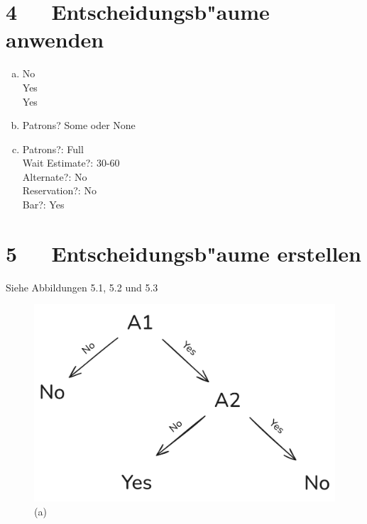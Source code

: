 \documentclass[10pt, oneside]{article}
\begin{document}
\section{4\ \ \ Entscheidungsb"aume anwenden}

\begin{enumerate}[(a)]
    \item No \\[5pt]
          Yes \\[5pt]
          Yes
    \item Patrons? Some oder None
    \item Patrons?: Full \\[5pt]
          Wait Estimate?: 30-60 \\[5pt]
          Alternate?: No \\[5pt]
          Reservation?: No \\[5pt]
          Bar?: Yes
\end{enumerate}

\section{5\ \ \ Entscheidungsb"aume erstellen}

Siehe Abbildungen 5.1, 5.2 und 5.3

\begin{figure}[p]
    \centering
    \includegraphics[width=1\textwidth]{./assets/ueb02-5-1.png}
    \caption{(a)}
\end{figure}

\FloatBarrier
\end{document}
